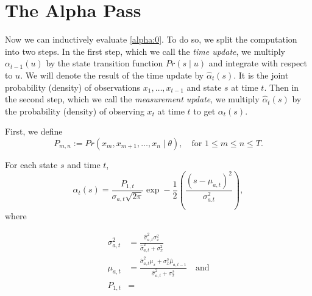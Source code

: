 \documentclass[12pt,leqno]{article}
\begin{document}
  \section{The Alpha Pass}

  Now we can inductively evaluate \eqref{alpha:0}. To do so, we split the computation
  into two steps.  In the first step, which we call the {\em time update}, we multiply
  $\alpha_{t-1}(u)$ by the state transition function $Pr(s\mid u)$ and integrate with respect
  to $u$. We will denote the result of the time update by $\hat{\alpha}_t(s)$.  It is the joint probability
  (density) of observations $x_1,\dots,x_{t-1}$ and state $s$ at time $t$.
  Then in the second step, which we call the {\em measurement update}, we multiply
  $\hat{\alpha}_t(s)$ by the probability (density) of observing $x_t$ at time $t$ to get $\alpha_t(s)$.

  First, we define
$$
P_{m,n} := Pr(x_m,x_{m+1},\dots,x_n \mid \theta),\quad\text{for $1\le m \le n\le T$}.
$$
\begin{Thm}\label{alpha:1}
  For each state $s$ and time $t$,
$$
  \alpha_t(s) = \frac{P_{1,t}}{\sigma_{a,t}\sqrt{2\pi}}\exp-\frac{1}{2}\left(\frac{(s-\mu_{a,t})^2}{\sigma_{a.t}^2}\right),
$$
  where

  \begin{align*}
  \sigma_{a,t}^2 &= \frac{\hat{\sigma}_{a,t}^2\sigma_x^2}{\hat{\sigma}_{a,t}^2+\sigma_x^2}\\
  \mu_{a,t} &= \frac{\hat{\sigma}_{a,t}^2\mu_x + \sigma_x^2\hat{\mu}_{a,t-1}}{\hat{\sigma}_{a,t}^2+\sigma_x^2}\quad\text{and}\\
  P_{1,t} &=
\end{align*}
\end{Thm}
\end{document}
